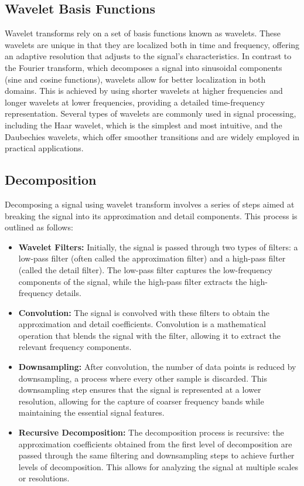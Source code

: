 \documentclass[conference]{IEEEtran}
\begin{document}
\subsection{Wavelet Basis Functions} Wavelet transforms rely on a set of basis functions known as wavelets. These wavelets are unique in that they are localized both in time and frequency, offering an adaptive resolution that adjusts to the signal's characteristics. In contrast to the Fourier transform, which decomposes a signal into sinusoidal components (sine and cosine functions), wavelets allow for better localization in both domains. This is achieved by using shorter wavelets at higher frequencies and longer wavelets at lower frequencies, providing a detailed time-frequency representation. Several types of wavelets are commonly used in signal processing, including the Haar wavelet, which is the simplest and most intuitive, and the Daubechies wavelets, which offer smoother transitions and are widely employed in practical applications.

\subsection{Decomposition} Decomposing a signal using wavelet transform involves a series of steps aimed at breaking the signal into its approximation and detail components. This process is outlined as follows:

\begin{itemize} \item \textbf{Wavelet Filters:} Initially, the signal is passed through two types of filters: a low-pass filter (often called the approximation filter) and a high-pass filter (called the detail filter). The low-pass filter captures the low-frequency components of the signal, while the high-pass filter extracts the high-frequency details. \item \textbf{Convolution:} The signal is convolved with these filters to obtain the approximation and detail coefficients. Convolution is a mathematical operation that blends the signal with the filter, allowing it to extract the relevant frequency components. \item \textbf{Downsampling:} After convolution, the number of data points is reduced by downsampling, a process where every other sample is discarded. This downsampling step ensures that the signal is represented at a lower resolution, allowing for the capture of coarser frequency bands while maintaining the essential signal features. \item \textbf{Recursive Decomposition:} The decomposition process is recursive: the approximation coefficients obtained from the first level of decomposition are passed through the same filtering and downsampling steps to achieve further levels of decomposition. This allows for analyzing the signal at multiple scales or resolutions. \end{itemize}
\end{document}
